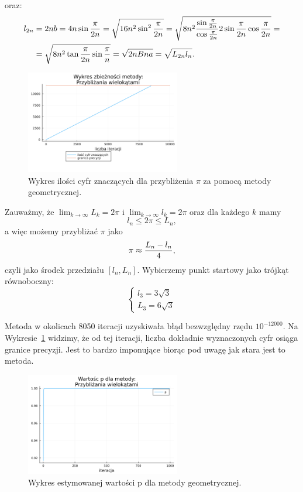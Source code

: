 oraz:
\begin{align*}
    l_{2n}&=2nb=4n\sin{\pi\over 2n}=\sqrt{16n^2\sin^2{\pi\over 2n}}=\sqrt{8n^2{\sin{\pi\over2n}\over\cos{\pi\over 2n}}2\sin{\pi\over 2n}\cos{\pi\over 2n}}=\\
    &=\sqrt{8n^2\tan{\pi\over 2n}\sin{\pi\over n}}=\sqrt{2nBna}=\sqrt{L_{2n}l_n}.
\end{align*}
\begin{figure}[!h]\centering
    \renewcommand{\figurename}{Wykres}
    \includegraphics[width=0.6\textwidth]{../prog/geo3_log_error.png}
    \caption{Wykres ilości cyfr znaczących dla przybliżenia $\pi$ za pomocą metody geometrycznej.}
    \label{geometric-error}
\end{figure}

Zauważmy, że $\lim_{k\to\infty}L_k=2\pi$ i $\lim_{k\to\infty}l_k=2\pi$ oraz dla każdego $k$ mamy
$$l_n\leq 2\pi\leq L_n,$$
a więc możemy przybliżać $\pi$ jako
$$\pi\approx{L_n-l_n\over 4},$$
czyli jako środek przedziału $[l_n,L_n]$. Wybierzemy punkt startowy jako trójkąt równoboczny:
$$\begin{cases}
    l_3=3\sqrt3\\
    L_3=6\sqrt3
\end{cases}$$

Metoda w okolicach 8050 iteracji uzyskiwała błąd bezwzględny rzędu $10^{-12000}$. Na Wykresie~\ref{geometric-error} widzimy, że od tej iteracji, liczba dokładnie wyznaczonych cyfr osiąga granice precyzji. Jest to bardzo imponujące biorąc pod uwagę jak stara jest to metoda.

\begin{figure}[!h]\centering
    \renewcommand{\figurename}{Wykres}
    \includegraphics[width=0.6\textwidth]{../prog/geo3_error_ratio.png}
    \caption{Wykres estymowanej wartości p dla metody geometrycznej.}
    \label{geometric-convergence}
\end{figure}

